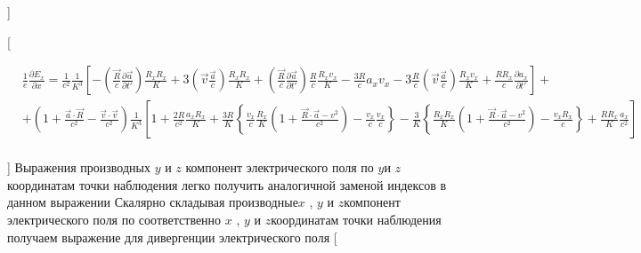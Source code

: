 \documentclass[11pt]{article}
\begin{document}
{]}

{[}

\begin{align}
  & \frac{1}{e}\frac{\partial {{E}_{x}}}{\partial x}=\frac{1}{{{c}^{2}}}\frac{1}{{{K}^{3}}}\left[ -\left( \frac{\overrightarrow{R}}{c}\frac{\partial \overrightarrow{a}}{\partial t'} \right)\frac{{{R}_{x}}{{R}_{x}}}{K}+3\left( \overrightarrow{v}\frac{\overrightarrow{a}}{c} \right)\frac{{{R}_{x}}{{R}_{x}}}{K}+\left( \frac{\overrightarrow{R}}{c}\frac{\partial \overrightarrow{a}}{\partial t'} \right)\frac{R}{c}\frac{{{R}_{x}}{{v}_{x}}}{K}-\frac{3R}{c}{{a}_{x}}{{v}_{x}}-3\frac{R}{c}\left( \overrightarrow{v}\frac{\overrightarrow{a}}{c} \right)\frac{{{R}_{x}}{{v}_{x}}}{K}+\frac{R{{R}_{x}}}{c}\frac{\partial {{a}_{x}}}{\partial t'} \right]+ \\ 
 & +\left( 1+\frac{\overrightarrow{a}\cdot \overrightarrow{R}}{{{c}^{2}}}-\frac{\overrightarrow{v}\cdot \overrightarrow{v}}{{{c}^{2}}} \right)\frac{1}{{{K}^{3}}}\left[ 1+\frac{2R}{{{c}^{2}}}\frac{{{a}_{x}}{{R}_{x}}}{K}+\frac{3R}{K}\left\{ \frac{{{v}_{x}}}{c}\frac{{{R}_{x}}}{K}\left( 1+\frac{\overrightarrow{R}\cdot \overrightarrow{a}-{{v}^{2}}}{{{c}^{2}}} \right)-\frac{{{v}_{x}}}{c}\frac{{{v}_{x}}}{c} \right\}-\frac{3}{K}\left\{ \frac{{{R}_{x}}{{R}_{x}}}{K}\left( 1+\frac{\overrightarrow{R}\cdot \overrightarrow{a}-{{v}^{2}}}{{{c}^{2}}} \right)-\frac{{{v}_{x}}{{R}_{x}}}{c} \right\}+\frac{R{{R}_{x}}}{K}\frac{{{a}_{x}}}{{{c}^{2}}} \right] \\ 
\end{align}

{]} Выражения производных \(y\) и \(z\) компонент электрического поля по
\(y\)и \(z\) координатам точки наблюдения легко получить аналогичной
заменой индексов в данном выражении Скалярно складывая производные\(x\)
, \(y\) и \(z\)компонент электрического поля по соответственно \(x\) ,
\(y\) и \(z\)координатам точки наблюдения получаем выражение для
дивергенции электрического поля {[}
\end{document}
